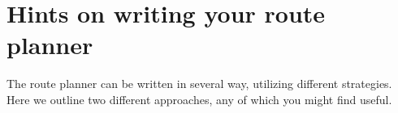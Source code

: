 \documentclass{article}
\begin{document}


\section{Hints on writing your route planner}

The route planner can be written in several way, utilizing different strategies. Here we outline two different approaches, any of which you might find useful.
\end{document}
